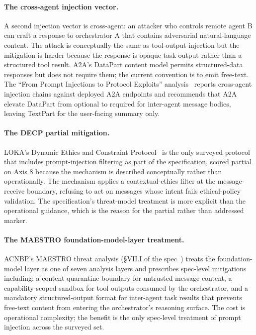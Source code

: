 \paragraph{The cross-agent injection vector.}
A second injection vector is cross-agent: an attacker who
controls remote agent B can craft a response to
orchestrator A that contains adversarial natural-language
content. The attack is conceptually the same as
tool-output injection but the mitigation is harder
because the response is opaque task output rather than
a structured tool result. A2A's DataPart content model
permits structured-data responses
but does not require them; the current convention is to
emit free-text. The
``From Prompt Injections to Protocol Exploits''
analysis~\cite{protocol_exploits} reports cross-agent
injection chains against deployed A2A endpoints and
recommends that A2A elevate DataPart from optional to
required for inter-agent message bodies, leaving TextPart
for the user-facing summary only.

\paragraph{The DECP partial mitigation.}
LOKA's Dynamic Ethics and Constraint
Protocol~\cite{spec_loka} is the only surveyed protocol
that includes prompt-injection filtering as part of the
specification, scored partial on Axis 8 because the
mechanism is described conceptually rather than
operationally. The mechanism applies a contextual-ethics
filter at the message-receive boundary, refusing to act
on messages whose intent fails ethical-policy validation.
The specification's threat-model treatment is more
explicit than the operational guidance, which is the
reason for the partial rather than addressed marker.

\paragraph{The MAESTRO foundation-model-layer treatment.}
ACNBP's MAESTRO threat analysis (\S VII.I of the
spec~\cite{spec_acnbp}) treats the foundation-model layer
as one of seven analysis layers and prescribes
spec-level mitigations including: a content-quarantine
boundary for untrusted message content, a
capability-scoped sandbox for tool outputs consumed by
the orchestrator, and a mandatory structured-output
format for inter-agent task results that prevents
free-text content from entering the orchestrator's
reasoning surface. The cost is operational complexity;
the benefit is the only spec-level treatment of prompt
injection across the surveyed set.

